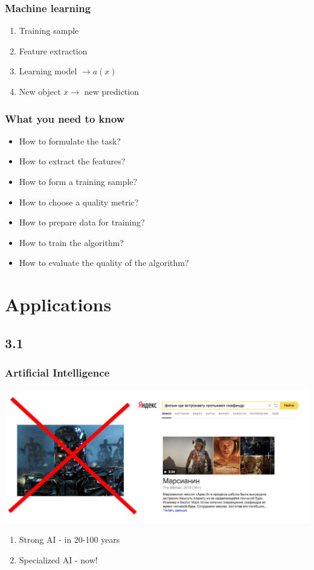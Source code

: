 \documentclass[default]{beamer}
\begin{document}
	\begin{frame}
		\frametitle{Machine learning}
		
		\Large
		\begin{enumerate}
			\item Training sample
			\item Feature extraction
			\item Learning model $\rightarrow a(x)$
			\item New object $x \rightarrow $ new prediction
		\end{enumerate}
	\end{frame}

	\begin{frame}
		\frametitle{What you need to know}
		
		\Large
		\begin{itemize}
			\item How to formulate the task?
			\item How to extract the features?
			\item How to form a training sample?
			\item How to choose a quality metric?
			\item How to prepare data for training?
			\item How to train the algorithm?
			\item How to evaluate the quality of the algorithm?
		\end{itemize}
	\end{frame}

	\section{Applications}
	\subsection{3.1}
	\begin{frame}
		\frametitle{Artificial Intelligence}
		
		\centering
		\includegraphics[width=\textwidth]{da_intro1.png}
		\Large
		\begin{enumerate}
			\item Strong AI - in 20-100 years
			\item Specialized AI - now!
		\end{enumerate}
	\end{frame}
\end{document}
